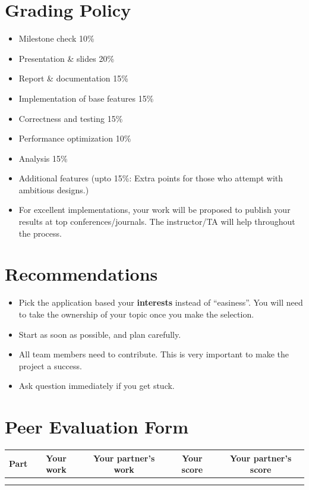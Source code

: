 \documentclass[a4paper,12pt,twoside]{article}
\begin{document}
\section{Grading Policy}
\begin{itemize}
    \item Milestone check 10\%
    \item Presentation \& slides 20\%
    \item Report \& documentation 15\%
\end{itemize}
\begin{itemize}
    \item Implementation of base features 15\%
    \item Correctness and testing 15\%
    \item Performance optimization 10\%
    \item Analysis 15\%
    \item Additional features (upto 15\%: Extra points for those who attempt with ambitious designs.)
    \item For excellent implementations, your work will be proposed to publish your results at top conferences/journals. The instructor/TA will help throughout the process.
\end{itemize}

\section{Recommendations}
\begin{itemize}
    \item Pick the application based your \textbf{interests} instead of ``easiness''. You will need to take the ownership of your topic once you make the selection.
    \item Start as soon as possible, and plan carefully. 
    \item All team members need to contribute. This is very important to make the project a success.
    \item Ask question immediately if you get stuck.
\end{itemize}

\newpage
\appendix
\section{Peer Evaluation Form}
\begin{table}[H]
    \centering
    \begin{tabular}{|c|c|c|c|c|}
        \hline
        Part & Your work & Your partner's work & Your score & Your partner's score \\
        \hline
        & & & & \\
        \hline
        & & & & \\
        \hline
    \end{tabular}
\end{table}
\end{document}
